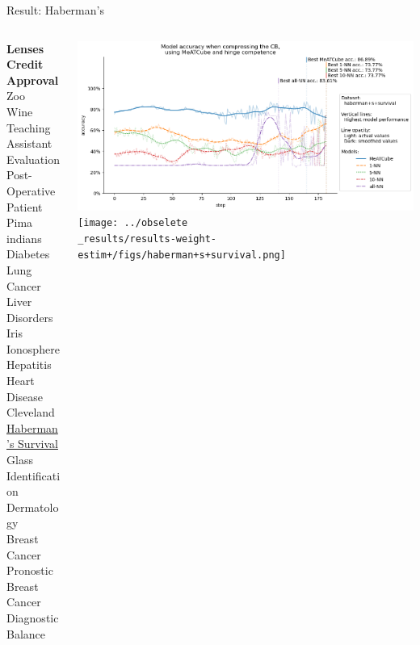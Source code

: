 \documentclass[]{beamer}
\begin{document}
\begin{frame}{Result: Haberman's}
    \begin{columns}
        \begin{column}{.3\textwidth}
            {\smaller\smaller\smaller
            \textbf{Lenses} \\
            \textbf{Credit Approval} \\
            Zoo \\
            Wine \\
            Teaching Assistant Evaluation \\
            Post-Operative Patient \\
            Pima indians Diabetes \\
            Lung Cancer \\
            Liver Disorders \\
            Iris \\
            Ionosphere \\
            Hepatitis \\
            Heart Disease Cleveland \\
            \underline{Haberman's Survival} \\
            Glass Identification \\
            Dermatology \\
            Breast Cancer Pronostic \\
            Breast Cancer Diagnostic \\
            Balance\\
            ~}
        \end{column}
        \begin{column}{.7\textwidth}
            \includegraphics[width=\textwidth]{../results-no-sim-tuning+/figs/haberman+s+survival.png}
            \texttt{[image: ../obselete\\\_results/results-weight-estim+/figs/haberman+s+survival.png]}
        \end{column}
    \end{columns}
\end{frame}
\end{document}
